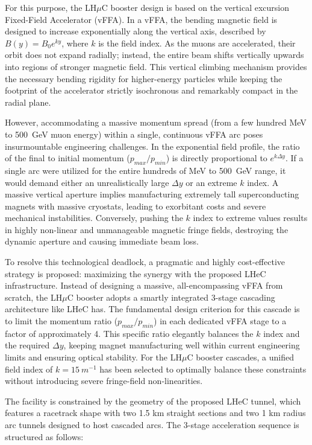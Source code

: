 \documentclass[a4paper,11pt]{article}
\newcommand{\lhuc}{LH\ensuremath{\mu}C\xspace}
\begin{document}
For this purpose, the \lhuc booster design is based on the vertical excursion Fixed-Field Accelerator (vFFA). In a vFFA, the bending magnetic field is designed to increase exponentially along the vertical axis, described by $B(y) = B_0 e^{ky}$, where $k$ is the field index. As the muons are accelerated, their orbit does not expand radially; instead, the entire beam shifts vertically upwards into regions of stronger magnetic field. This vertical climbing mechanism provides the necessary bending rigidity for higher-energy particles while keeping the footprint of the accelerator strictly isochronous and remarkably compact in the radial plane.

However, accommodating a massive momentum spread (from a few hundred MeV to 500~GeV muon energy) within a single, continuous vFFA arc poses insurmountable engineering challenges. In the exponential field profile, the ratio of the final to initial momentum ($p_{max}/p_{min}$) is directly proportional to $e^{k \Delta y}$. If a single arc were utilized for the entire hundreds of MeV to 500~GeV range, it would demand either an unrealistically large $\Delta y$ or an extreme $k$ index. A massive vertical aperture implies manufacturing extremely tall superconducting magnets with massive cryostats, leading to exorbitant costs and severe mechanical instabilities. Conversely, pushing the $k$ index to extreme values results in highly non-linear and unmanageable magnetic fringe fields, destroying the dynamic aperture and causing immediate beam loss.

To resolve this technological deadlock, a pragmatic and highly cost-effective strategy is proposed: maximizing the synergy with the proposed LHeC infrastructure. Instead of designing a massive, all-encompassing vFFA from scratch, the \lhuc booster adopts a smartly integrated 3-stage cascading architecture like LHeC has. The fundamental design criterion for this cascade is to limit the momentum ratio ($p_{max}/p_{min}$) in each dedicated vFFA stage to a factor of approximately 4. This specific ratio elegantly balances the $k$ index and the required $\Delta y$, keeping magnet manufacturing well within current engineering limits and ensuring optical stability. For the \lhuc booster cascades, a unified field index of $k=15~m^{-1}$ has been selected to optimally balance these constraints without introducing severe fringe-field non-linearities. 

The facility is constrained by the geometry of the proposed LHeC tunnel, which features a racetrack shape with two 1.5 km straight sections and two 1 km radius arc tunnels designed to host cascaded arcs. The 3-stage acceleration sequence is structured as follows:
\end{document}
